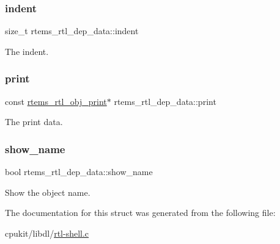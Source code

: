 \subsubsection{\texorpdfstring{indent}{indent}}
{\footnotesize\ttfamily size\+\_\+t rtems\+\_\+rtl\+\_\+dep\+\_\+data\+::indent}

The indent. \mbox{\label{structrtems__rtl__dep__data_ad0cbfe0898814b3ea9d1aa435b5a6049}} 
\subsubsection{\texorpdfstring{print}{print}}
{\footnotesize\ttfamily const \mbox{\hyperlink{structrtems__rtl__obj__print}{rtems\+\_\+rtl\+\_\+obj\+\_\+print}}$\ast$ rtems\+\_\+rtl\+\_\+dep\+\_\+data\+::print}

The print data. \mbox{\label{structrtems__rtl__dep__data_a20898594eb914745c1799d6a4e02cc19}} 
\subsubsection{\texorpdfstring{show\_name}{show\_name}}
{\footnotesize\ttfamily bool rtems\+\_\+rtl\+\_\+dep\+\_\+data\+::show\+\_\+name}

Show the object name. 

The documentation for this struct was generated from the following file\+:\begin{DoxyCompactItemize}
\item 
cpukit/libdl/\mbox{\hyperlink{rtl-shell_8c}{rtl-\/shell.\+c}}\end{DoxyCompactItemize}
